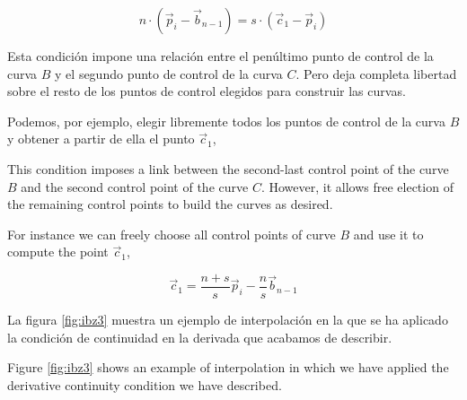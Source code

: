 \begin{equation*}
n\cdot\left(\vec{p}_i-\vec{b}_{n-1}\right) = s\cdot\left(\vec{c}_1-\vec{p}_i\right)
\end{equation*}
\begin{paracol}{2} 
Esta condición impone una relación entre el penúltimo punto de control de la curva $B$ y el segundo punto de control de la curva $C$. Pero deja completa libertad sobre el resto de los puntos de control elegidos para construir las curvas.

Podemos, por ejemplo, elegir libremente todos los puntos de control de la curva $B$ y obtener a partir de ella el punto $\vec{c}_1$,

\switchcolumn
This condition imposes a link between the second-last control point of the curve $B$ and the second control point of the curve $C$. However, it allows free election of the remaining control points to build the curves as desired.

For instance we can freely choose all control points of curve $B$ and use it to compute the point $\vec{c}_1$,
\end{paracol}
\begin{equation*}
\vec{c}_1 = \frac{n+s}{s}\vec{p}_i - \frac{n}{s}\vec{b}_{n-1}
\end{equation*}
\begin{paracol}{2}
	La figura \ref{fig:ibz3} muestra un ejemplo de interpolación en la que se ha aplicado la condición de continuidad en la derivada que acabamos de describir.
	
	\switchcolumn
	Figure \ref{fig:ibz3} shows an example of interpolation in which we have applied the derivative continuity condition we have described. 
\end{paracol}

